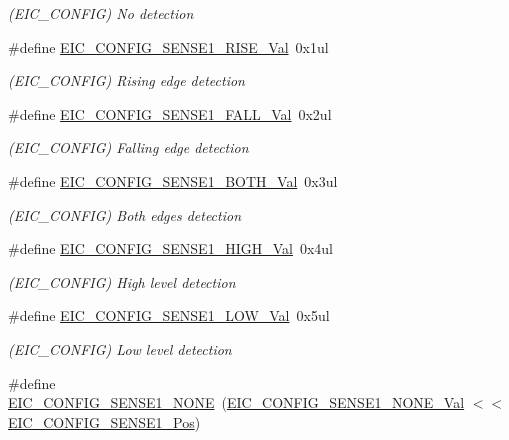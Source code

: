 \begin{DoxyCompactItemize}
\begin{DoxyCompactList}\small\item\em (E\+I\+C\+\_\+\+C\+O\+N\+F\+IG) No detection \end{DoxyCompactList}\item 
\#define \mbox{\hyperlink{group___s_a_m_d21___e_i_c_ga390eb7bfde2edc0c8f7c2aecc55f2f11}{E\+I\+C\+\_\+\+C\+O\+N\+F\+I\+G\+\_\+\+S\+E\+N\+S\+E1\+\_\+\+R\+I\+S\+E\+\_\+\+Val}}~0x1ul
\begin{DoxyCompactList}\small\item\em (E\+I\+C\+\_\+\+C\+O\+N\+F\+IG) Rising edge detection \end{DoxyCompactList}\item 
\#define \mbox{\hyperlink{group___s_a_m_d21___e_i_c_ga0ca6a376817490cb3ef82906ffe21923}{E\+I\+C\+\_\+\+C\+O\+N\+F\+I\+G\+\_\+\+S\+E\+N\+S\+E1\+\_\+\+F\+A\+L\+L\+\_\+\+Val}}~0x2ul
\begin{DoxyCompactList}\small\item\em (E\+I\+C\+\_\+\+C\+O\+N\+F\+IG) Falling edge detection \end{DoxyCompactList}\item 
\#define \mbox{\hyperlink{group___s_a_m_d21___e_i_c_gabb0c4499b66df5612c61697749c38f6f}{E\+I\+C\+\_\+\+C\+O\+N\+F\+I\+G\+\_\+\+S\+E\+N\+S\+E1\+\_\+\+B\+O\+T\+H\+\_\+\+Val}}~0x3ul
\begin{DoxyCompactList}\small\item\em (E\+I\+C\+\_\+\+C\+O\+N\+F\+IG) Both edges detection \end{DoxyCompactList}\item 
\#define \mbox{\hyperlink{group___s_a_m_d21___e_i_c_gad9d6fe0929c266f663d7fb7b05296098}{E\+I\+C\+\_\+\+C\+O\+N\+F\+I\+G\+\_\+\+S\+E\+N\+S\+E1\+\_\+\+H\+I\+G\+H\+\_\+\+Val}}~0x4ul
\begin{DoxyCompactList}\small\item\em (E\+I\+C\+\_\+\+C\+O\+N\+F\+IG) High level detection \end{DoxyCompactList}\item 
\#define \mbox{\hyperlink{group___s_a_m_d21___e_i_c_gaece415d353240e8ee175072f6a5224cd}{E\+I\+C\+\_\+\+C\+O\+N\+F\+I\+G\+\_\+\+S\+E\+N\+S\+E1\+\_\+\+L\+O\+W\+\_\+\+Val}}~0x5ul
\begin{DoxyCompactList}\small\item\em (E\+I\+C\+\_\+\+C\+O\+N\+F\+IG) Low level detection \end{DoxyCompactList}\item 
\#define \mbox{\hyperlink{group___s_a_m_d21___e_i_c_ga8ee9de103d7fa21e56b6ee8fb6a75df5}{E\+I\+C\+\_\+\+C\+O\+N\+F\+I\+G\+\_\+\+S\+E\+N\+S\+E1\+\_\+\+N\+O\+NE}}~(\mbox{\hyperlink{group___s_a_m_d21___e_i_c_ga2dd12fe5d69cac11eb3b807a1ba2972a}{E\+I\+C\+\_\+\+C\+O\+N\+F\+I\+G\+\_\+\+S\+E\+N\+S\+E1\+\_\+\+N\+O\+N\+E\+\_\+\+Val}}    $<$$<$ \mbox{\hyperlink{group___s_a_m_d21___e_i_c_gab34794f88d0b20fa2792afe7fecd7fc1}{E\+I\+C\+\_\+\+C\+O\+N\+F\+I\+G\+\_\+\+S\+E\+N\+S\+E1\+\_\+\+Pos}})
$$
\end{DoxyCompactItemize}

